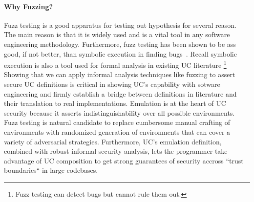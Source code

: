 \paragraph{Why Fuzzing?}
Fuzz testing is a good apparatus for testing out hypothesis for several reason.
The main reason is that it is widely used and is a vital tool in any software engineering methodology.
Furthermore, fuzz testing has been shown to be ass good, if not better, than symbolic execution in finding bugs~\cite{citation1}.
Recall symbolic execution is also a tool used for formal analysis in existing UC literature \footnote{Fuzz testing can detect bugs but cannot rule them out.}
Showing that we can apply informal analysis techniques like fuzzing to assert secure UC definitions is critical in showing UC's capability with sotware engineering and firmly establish a bridge between definitions in literature and their translation to real implementations. 
Emulation is at the heart of UC security because it asserts indistinguishability over all possible environments. 
Fuzz testing is natural candidate to replace cumbersome manual crafting of environments with randomized generation of environments that can cover a variety of adversarial strategies.
Furthermore, UC's emulation definition, combined with robust informal security analysis, lets the programmer take advantage of UC composition to get strong guarantees of security accross ``trust boundaries`` in large codebases.

